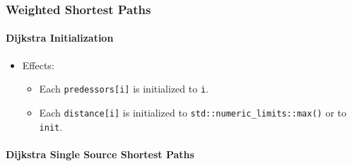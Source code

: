 \subsubsection{Weighted Shortest Paths}

\paragraph{Dijkstra Initialization}

{\small

}



\begin{itemize}
\item[] 
Effects:
\begin{itemize}
\item[]
  Each \lstinline{predessors[i]} is initialized to \lstinline{i}.
\item[] Each 
\lstinline{distance[i]} is initialized to \lstinline{std::numeric_limits::max()}
or to \lstinline{init}.
\end{itemize}
\end{itemize}


\paragraph{Dijkstra Single Source Shortest Paths}

{\small

}


